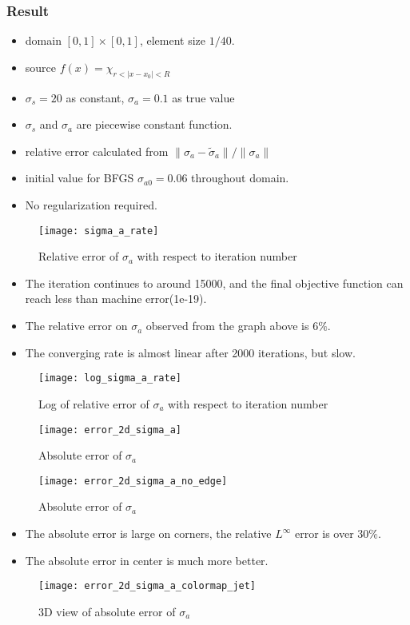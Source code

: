 \documentclass[12pt,a4paper]{report}
\begin{document}
\subsubsection{Result}
\begin{itemize}
\item domain $[0, 1]\times [0, 1]$, element size $1/40$.
\item source $f(x) = \chi_{r < |x - x_0| < R}$
\item $\sigma_s = 20$ as constant, $\sigma_a = 0.1$ as true value
\item $\sigma_s$ and $\sigma_a$ are piecewise constant function.
\item relative error calculated from $\|\sigma_a - \tilde{\sigma}_a\|/\|\sigma_a\|$
\item initial value for BFGS $\sigma_{a0} = 0.06$ throughout domain.
\item No regularization required.
\end{itemize}

\begin{figure}[htb]
\texttt{[image: sigma\_a\_rate]}
\caption{Relative error of $\sigma_a$ with respect to iteration number}
\end{figure}
\begin{itemize}
\item The iteration continues to around 15000, and the final objective function can reach less than machine error(1e-19).
\item The relative error on $\sigma_a$ observed from the graph above is $6\%$.
\item The converging rate is almost linear after 2000 iterations, but slow. 
\end{itemize}

\begin{figure}[htb]
\texttt{[image: log\_sigma\_a\_rate]}
\caption{Log of relative error of $\sigma_a$ with respect to iteration number}
\end{figure}
\begin{figure}[htb!]
	\texttt{[image: error\_2d\_sigma\_a]}
	\caption{Absolute error of $\sigma_a$}
\end{figure}
\begin{figure}[htb!]
	\texttt{[image: error\_2d\_sigma\_a\_no\_edge]}
	\caption{Absolute error of $\sigma_a$}
\end{figure}
\begin{itemize}
\item The absolute error is large on corners, the relative $L^{\infty}$ error is over $30\%$.
\item The absolute error in center is much more better.
\end{itemize}
\begin{figure}[htb!]
	\texttt{[image: error\_2d\_sigma\_a\_colormap\_jet]}
	\caption{3D view of absolute error of $\sigma_a$}
\end{figure}
\newpage
\end{document}
